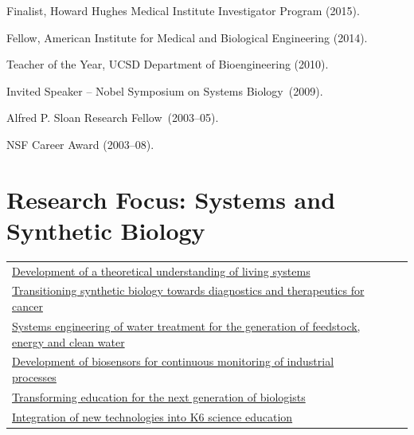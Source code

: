 Finalist, Howard Hughes Medical Institute Investigator Program (2015). 

\item Fellow, American Institute for Medical and Biological Engineering (2014). 

\item Teacher of the Year, UCSD Department of Bioengineering (2010).

\item Invited Speaker -- Nobel Symposium on Systems Biology~(2009).

\item Alfred P. Sloan Research Fellow~(2003--05).

\item NSF Career Award (2003--08).

 

\section{Research Focus: Systems and Synthetic Biology}
\begin{tabular}{lll} 
\href{http://qbio.ucsd.edu}{Development of a theoretical understanding of living systems}\\
\href{http://gencirq.com}{Transitioning synthetic biology towards diagnostics and therapeutics for cancer}\\
\href{https://www.qbisci.com/fiscalini-dairy}{Systems engineering of water treatment for the generation of feedstock, energy and clean water}\\
\href{https://www.qbisci.com/sensors/}{Development of biosensors for continuous monitoring of industrial processes}\\
\href{https://qbio.ucsd.edu}{Transforming education for the next generation of biologists}\\
\href{http://biocircuits.sdsc.edu/outreach/}{Integration of new technologies into K6 science education}\\
\end{tabular}\\
    





